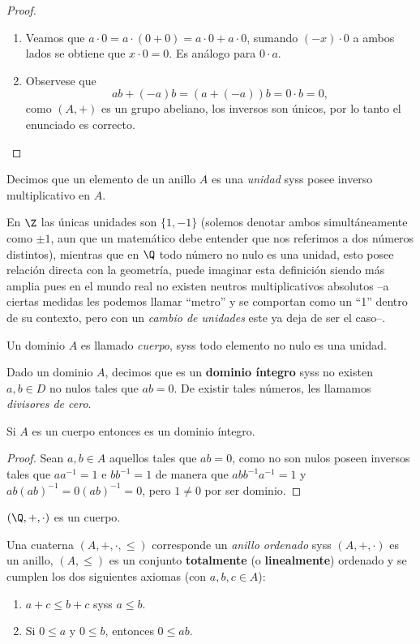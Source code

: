 \documentclass[11pt,oneside]{book}
\begin{document}
\begin{proof}
\begin{enumerate}[$a)$]
	\item Veamos que $a\cdot 0=a\cdot(0+0)=a\cdot0+a\cdot0$, sumando $(-x)\cdot 0$ a ambos lados se obtiene que $x\cdot 0=0$. Es análogo para $0\cdot a$.
	\item Observese que
	$$ab+(-a)b=(a+(-a))b=0\cdot b=0,$$
	como $(A,+)$ es un grupo abeliano, los inversos son únicos, por lo tanto el enunciado es correcto.
\end{enumerate}
\end{proof}
\begin{mydef}[Unidad]
Decimos que un elemento de un anillo $A$ es una \textit{unidad} syss posee inverso multiplicativo en $A$.
\end{mydef}
En $\Z$ las únicas unidades son $\{1,-1\}$ (solemos denotar ambos simultáneamente como $\pm 1$, aun que un matemático debe entender que nos referimos a dos números distintos), mientras que en $\Q$ todo número no nulo es una unidad, esto posee relación directa con la geometría, puede imaginar esta definición siendo más amplia pues en el mundo real no existen neutros multiplicativos absolutos --a ciertas medidas les podemos llamar ``metro'' y se comportan como un ``1'' dentro de su contexto, pero con un \textit{cambio de unidades} este ya deja de ser el caso--.
\begin{mydef}[Cuerpo]
Un dominio $A$ es llamado \textit{cuerpo}, syss todo elemento no nulo es una unidad.
\end{mydef}
\begin{mydef}
Dado un dominio $A$, decimos que es un \textbf{dominio íntegro} syss no existen $a,b\in D$ no nulos tales que $ab=0$. De existir tales números, les llamamos \textit{divisores de cero}.
\end{mydef}
\begin{thm}
Si $A$ es un cuerpo entonces es un dominio íntegro.
\end{thm}
\begin{proof}
Sean $a,b\in A$ aquellos tales que $ab=0$, como no son nulos poseen inversos tales que $aa^{-1}=1$ e $bb^{-1}=1$ de manera que $abb^{-1}a^{-1}=1$ y $ab(ab)^{-1}=0(ab)^{-1}=0$, pero $1\neq 0$ por ser dominio.
\end{proof}
\begin{thm}
$(\Q,+,\cdot)$ es un cuerpo.
\end{thm}
\begin{mydef}
Una cuaterna $(A,+,\cdot,\leq)$ corresponde un \textit{anillo ordenado} syss $(A,+,\cdot)$ es un anillo, $(A,\leq)$ es un conjunto \textbf{totalmente} (o \textbf{linealmente}) ordenado y se cumplen los dos siguientes axiomas (con $a,b,c\in A$):
\begin{enumerate}
\item $a+c\leq b+c$ syss $a\leq b$.
\item Si $0\leq a$ y $0\leq b$, entonces $0\leq ab$.
\end{enumerate}
\end{mydef}
\end{document}

